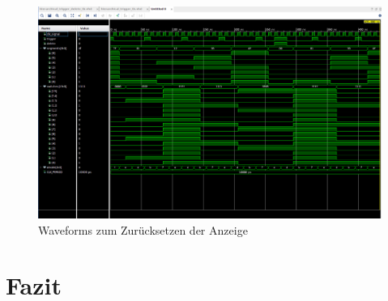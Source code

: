 \documentclass[11pt, a4paper]{article}
\begin{document}
\begin{figure}[htb]    
    \centering
    \includegraphics[width=\linewidth]{versuch5Data/hierarchicalDelete.png}
    \caption{Waveforms zum Zurücksetzen der Anzeige}
    \label{waveformDelete}        
\end{figure}

\section*{Fazit}
\end{document}
